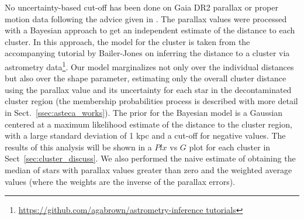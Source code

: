 \documentclass[draft]{aa}
\begin{document}
No uncertainty-based cut-off has been done on Gaia DR2 parallax or proper
motion data following the advice given in \cite{Luri_2018}. The parallax values
were processed with a Bayesian approach to get an independent estimate of the
distance to each cluster. In this approach, the model for the cluster is
taken from the accompanying tutorial by Bailer-Jones on inferring the distance
to a cluster via astrometry
data\footnote{\url{https://github.com/agabrown/astrometry-inference tutorials}}.
Our model marginalizes not only over the individual distances but also over the
shape parameter, estimating only the overall cluster distance using the
parallax value and its uncertainty for each star in the decontaminated cluster
region (the membership probabilities process is described with more detail in
Sect.~\ref{ssec:asteca_works}).
The prior for the Bayesian model is a Gaussian centered at a maximum likelihood
estimate of the distance to the cluster region, with a large standard deviation
of 1 kpc and a cut-off for negative values. The results of this analysis will
be shown in a $Plx$ vs $G$ plot for each cluster in
Sect~\ref{sec:cluster_discuss}. We also performed the naive estimate of
obtaining the median of stars with parallax values greater than zero
and the weighted average values (where the weights are the inverse of the
parallax errors). 

\end{document}
